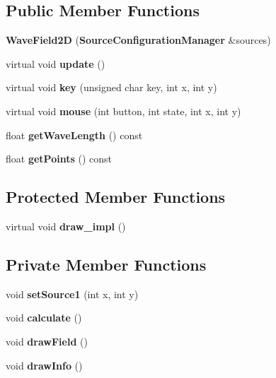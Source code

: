 \subsection*{Public Member Functions}
\begin{DoxyCompactItemize}
\item 
{\bfseries Wave\-Field2\-D} ({\bf Source\-Configuration\-Manager} \&sources)\label{classSoundfieldViewer_1_1WaveField2D_a1fc5117fc72e95bff307dde013b12483}

\item 
virtual void {\bfseries update} ()\label{classSoundfieldViewer_1_1WaveField2D_a3eff6e3f052c58d06389f85caa9ad101}

\item 
virtual void {\bfseries key} (unsigned char key, int x, int y)\label{classSoundfieldViewer_1_1WaveField2D_add0662b58725367a679358c838b0b955}

\item 
virtual void {\bfseries mouse} (int button, int state, int x, int y)\label{classSoundfieldViewer_1_1WaveField2D_af7b42a81e9ff47988328e9bf23993ee2}

\item 
float {\bfseries get\-Wave\-Length} () const \label{classSoundfieldViewer_1_1WaveField2D_ac542f963e5df93c5a442a047063434ff}

\item 
float {\bfseries get\-Points} () const \label{classSoundfieldViewer_1_1WaveField2D_a826a74329d67d11e4c2065671481f4ed}

\end{DoxyCompactItemize}
\subsection*{Protected Member Functions}
\begin{DoxyCompactItemize}
\item 
virtual void {\bfseries draw\-\_\-impl} ()\label{classSoundfieldViewer_1_1WaveField2D_a5ed605e16763bda940034d483cde993a}

\end{DoxyCompactItemize}
\subsection*{Private Member Functions}
\begin{DoxyCompactItemize}
\item 
void {\bfseries set\-Source1} (int x, int y)\label{classSoundfieldViewer_1_1WaveField2D_a35d2ed3cd8344c1f90086bc4183d08e8}

\item 
void {\bfseries calculate} ()\label{classSoundfieldViewer_1_1WaveField2D_a4f3dd33336f37f51eff1787e43472a9a}

\item 
void {\bfseries draw\-Field} ()\label{classSoundfieldViewer_1_1WaveField2D_a3c6276ebecc65f517037cc58bfa1c45c}

\item 
void {\bfseries draw\-Info} ()\label{classSoundfieldViewer_1_1WaveField2D_a84301c02e29dc6185720bb83d1c5da16}

\end{DoxyCompactItemize}
